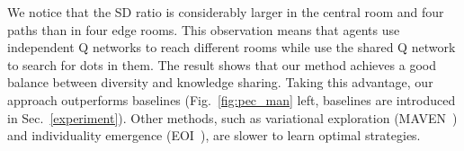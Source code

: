 We notice that the SD ratio is considerably larger in the central room and four paths than in four edge rooms. This observation means that agents use independent Q networks to reach different rooms while use the shared Q network to search for dots in them. The result shows that our method achieves a good balance between diversity and knowledge sharing. Taking this advantage, our approach outperforms baselines (Fig.~\ref{fig:pec_man} left, baselines are introduced in Sec.~\ref{experiment}). Other methods, such as variational exploration (MAVEN~\cite{mahajan2019maven}) and individuality emergence (EOI~\cite{jiang2020emergence}), are slower to learn optimal strategies.


